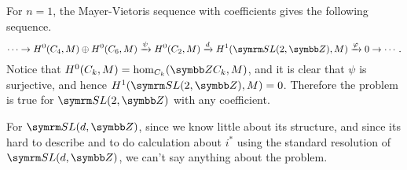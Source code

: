 For $n=1$, the Mayer-Vietoris sequence with coefficients gives the following sequence.
\begin{equation*}
  \dotsb\to H^{0}(\CYC4, M)\oplus H^{0}(\CYC6, M)\xrightarrow{\psi} H^{0}(\CYC2, M)\xrightarrow{d} H^1(\SLtZ, M)\xrightarrow{\varphi} 0\to\dotsb.
\end{equation*}
Notice that $H^0(C_k, M)=\HOM_{C_k}(\ZZ C_k, M)$, and it is clear that $\psi$ is surjective, and hence $H^1(\SLtZ, M)=0$. Therefore the problem is true for $\SLtZ$ with any coefficient.

For $\SL(d, \ZZ)$, since we know little about its structure, and since its hard to describe and to do calculation about $i^*$ using the standard resolution of $\SL(d, \ZZ)$, we can't say anything about the problem.
